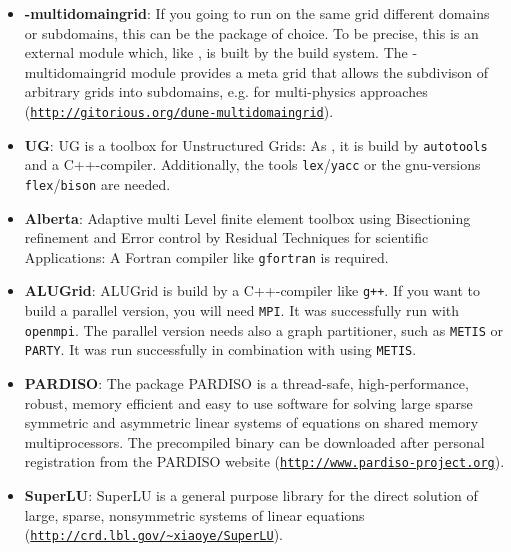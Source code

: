 \begin{itemize}
\item \textbf{\Dune-multidomaingrid}: If you going to run on the same grid different domains or subdomains, this can be the package of choice. 
To be precise, this is an external \Dune module which, like \Dumux, is built by the \Dune build system. The \Dune-multidomaingrid module provides a meta grid that allows the subdivison of arbitrary \Dune grids into subdomains, e.g. for multi-physics approaches (\texttt{\url{http://gitorious.org/dune-multidomaingrid}}).

\item \textbf{UG}: UG is a toolbox for Unstructured Grids: As \Dumux, it is build by \texttt{autotools} and a C++-compiler. Additionally, the tools \texttt{lex}/\texttt{yacc} or the gnu-versions \texttt{flex}/\texttt{bison} are needed. 

\item \textbf{Alberta}: Adaptive multi Level finite element toolbox using Bisectioning refinement and Error control by Residual Techniques for scientific Applications: A Fortran compiler like \texttt{gfortran} is required.

\item \textbf{ALUGrid}: ALUGrid is build by a C++-compiler like \texttt{g++}. If you want to build a parallel version, you will need \texttt{MPI}. It was successfully run with \texttt{openmpi}. The parallel version needs also a graph partitioner, such as \texttt{METIS} or \texttt{PARTY}. It was run successfully in combination with \Dune using \texttt{METIS}.

\item \textbf{PARDISO}: The package PARDISO is a thread-safe, high-performance, robust, memory efficient and easy to use software for solving large sparse symmetric and asymmetric linear systems of equations on shared memory multiprocessors. The precompiled binary can be downloaded after personal registration from the PARDISO website (\texttt{\url{http://www.pardiso-project.org}}).

\item \textbf{SuperLU}: SuperLU is a general purpose library for the direct solution of large, sparse, nonsymmetric systems of linear equations (\texttt{\url{http://crd.lbl.gov/~xiaoye/SuperLU}}).

\end{itemize}

